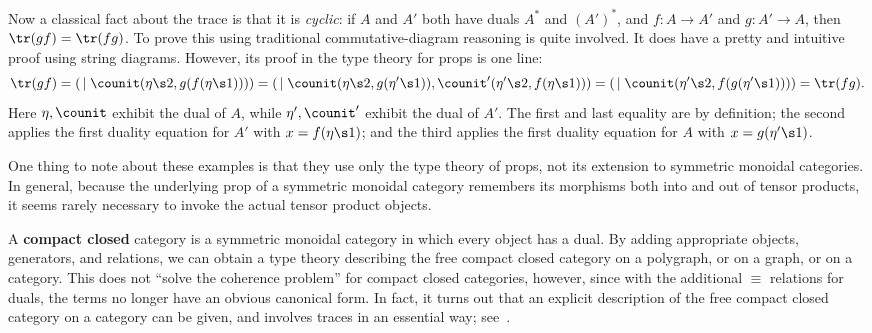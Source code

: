 Now a classical fact about the trace is that it is \emph{cyclic}: if $A$ and $A'$ both have duals $A^*$ and $(A')^*$, and $f:A\to A'$ and $g:A'\to A$, then $\tr(gf) = \tr(fg)$.
To prove this using traditional commutative-diagram reasoning is quite involved.
It does have a pretty and intuitive proof using string diagrams.
However, its proof in the type theory for props is one line:
\[ \tr(gf) = (\,\mid \counit(\eta\s2,g(f(\eta\s1))))
= (\,\mid \counit(\eta\s2,g(\eta'\s1)),\counit'(\eta'\s2,f(\eta\s1)))
= (\,\mid \counit(\eta'\s2,f(g(\eta'\s1))))
= \tr(fg).
\]
Here $\eta,\counit$ exhibit the dual of $A$, while $\eta',\counit'$ exhibit the dual of $A'$.
The first and last equality are by definition;
the second applies the first duality equation for $A'$ with $x=f(\eta\s1)$; and the third applies the first duality equation for $A$ with $x=g(\eta'\s1)$.

One thing to note about these examples is that they use only the type theory of props, not its extension to symmetric monoidal categories.
In general, because the underlying prop of a symmetric monoidal category remembers its morphisms both into and out of tensor products, it seems rarely necessary to invoke the actual tensor product objects.

\begin{rmk}
  A \textbf{compact closed} category is a symmetric monoidal category in which every object has a dual.
  By adding appropriate objects, generators, and relations, we can obtain a type theory describing the free compact closed category on a polygraph, or on a graph, or on a category.
  This does not ``solve the coherence problem'' for compact closed categories, however, since with the additional $\equiv$ relations for duals, the terms no longer have an obvious canonical form.
  In fact, it turns out that an explicit description of the free compact closed category on a category can be given, and involves traces in an essential way; see~\cite{kl:cpt}.
\end{rmk}


